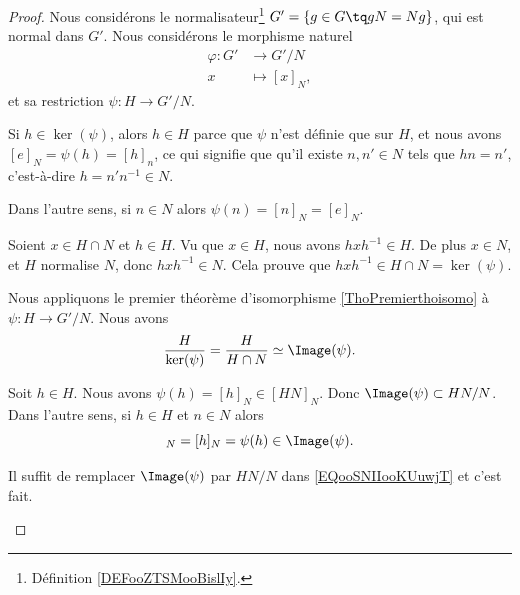\begin{proof}
	Nous considérons le normalisateur\footnote{Définition \ref{DEFooZTSMooBislIy}.} \( G'=\{ g\in G\tq gN=Ng \}\), qui est normal dans \( G'\). Nous considérons le morphisme naturel
	\begin{equation}
		\begin{aligned}
			\varphi\colon G' & \to G'/N       \\
			x                & \mapsto [x]_N,
		\end{aligned}
	\end{equation}
	et sa restriction \(\psi \colon H\to G'/N  \).
	\begin{subproof}
		\spitem[\( \ker(\psi)=H\cap N\)]
		Si \( h\in \ker(\psi)\), alors \( h\in H\) parce que \( \psi \) n'est définie que sur \( H\), et nous avons \( [e]_N=\psi(h)=[h]_n\), ce qui signifie que qu'il existe \( n,n'\in N\) tels que \( hn=n'\), c'est-à-dire \( h=n'n^{-1}\in N\).

		Dans l'autre sens, si \( n\in N\) alors \( \psi(n)=[n]_N=[e]_N\).

		Soient \( x\in H\cap N\) et \( h\in H\). Vu que \( x\in H\), nous avons \( hxh^{-1}\in H\). De plus \( x\in N\), et \( H\) normalise \( N\), donc \( hxh^{-1}\in N\). Cela prouve que \( hxh^{-1}\in H\cap N=\ker(\psi)\).

		Nous appliquons le premier théorème d'isomorphisme \ref{ThoPremierthoisomo} à \(\psi \colon H\to G'/N  \). Nous avons
		\begin{equation}		\label{EQooSNIIooKUuwjT}
			\frac{ H }{ \ker(\psi) }=\frac{ H }{ H\cap N }\simeq \Image(\psi).
		\end{equation}

		\spitem[\( \Image(\psi)=HN/N\)]
		Soit \( h\in H\). Nous avons \( \psi(h)=[h]_N\in[HN]_N\). Donc \( \Image(\psi)\subset HN/N\). Dans l'autre sens, si \( h\in H\) et \( n\in N\) alors
		\begin{equation}
			[hn]_N=[h]_N=\psi(h)\in\Image(\psi).
		\end{equation}

		\spitem[Conclusion]
		Il suffit de remplacer \( \Image(\psi)\) par \( HN/N\) dans \eqref{EQooSNIIooKUuwjT} et c'est fait.
	\end{subproof}
\end{proof}


